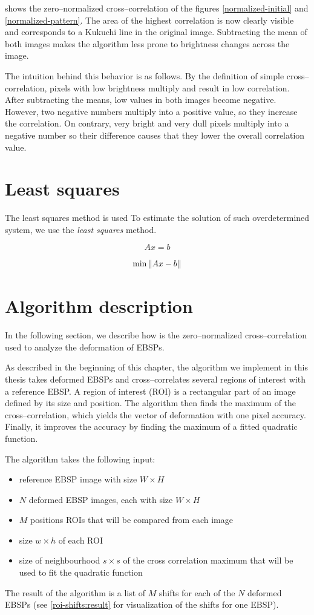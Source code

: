  shows the zero--normalized cross--correlation of the figures \ref{normalized-initial} and \ref{normalized-pattern}. The area of the highest correlation is now clearly visible and corresponds to a Kukuchi line in the original image. Subtracting the mean of both images makes the algorithm less prone to brightness changes across the image.



The intuition behind this behavior is as follows. By the definition of simple cross--correlation, pixels with low brightness multiply and result in low correlation. After subtracting the means, low values in both images become negative. However, two negative numbers multiply into a positive value, so they increase the correlation. On contrary, very bright and very dull pixels multiply into a negative number so their difference causes that they lower the overall correlation value.

\section{Least squares}

The least squares method is used 
To estimate the solution of such overdetermined system, we use the \emph{least squares} method.

\[
Ax = b
\]

\[
\min \left\lVert Ax - b\right\rVert
\]



\section{Algorithm description}

In the following section, we describe how is the zero--normalized cross--corre\-lation used to analyze the deformation of EBSPs.

As described in the beginning of this chapter, the algorithm we implement in this thesis takes deformed EBSPs and cross--correlates several regions of interest with a reference EBSP. A region of interest (ROI) is a rectangular part of an image defined by its size and position. The algorithm then finds the maximum of the cross--correlation, which yields the vector of deformation with one pixel accuracy. Finally, it improves the accuracy by finding the maximum of a fitted quadratic function.

The algorithm takes the following input:
\begin{itemize}
	\item reference EBSP image with size $W \times H$
	\item $N$ deformed EBSP images, each with size $W \times H$
	\item $M$ positions ROIs that will be compared from each image
	\item size $w \times h$ of each ROI
	\item size of neighbourhood $s \times s$ of the cross correlation maximum that will be used to fit the quadratic function
\end{itemize}
The result of the algorithm is a list of $M$ shifts for each of the $N$ deformed EBSPs (see \cref{roi-shifts:result} for visualization of the shifts for one EBSP).

